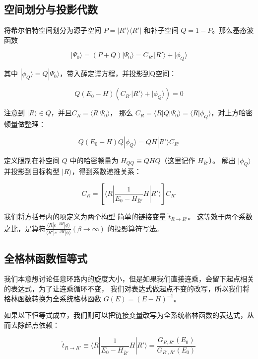\documentclass[a4paper,12pt]{article}
\begin{document}
\subsection{空间划分与投影代数}

将希尔伯特空间划分为源子空间 $P = |R'\rangle\langle R'|$ 和补子空间 $Q = 1 - P$。那么基态波函数 

$$
|\Psi_0\rangle = (P + Q) |\Psi_0\rangle= C_{R'} |R'\rangle + |\phi_Q\rangle
$$

其中 $|\phi_Q\rangle = Q|\Psi_0\rangle$，带入薛定谔方程，并投影到Q空间：

$$
Q(E_0-H) (C_{R'} |R'\rangle + |\phi_Q\rangle) = 0
$$

注意到 $|R\rangle \in Q$，并且$C_R = \langle R |\Psi_0\rangle$，
那么 $C_R = \langle R| Q |\Psi_0\rangle = \langle R |\phi_Q\rangle$，对上方哈密顿量做整理：

\begin{equation}
    Q(E_0 - H)Q |\phi_Q\rangle = Q H  |R'\rangle C_{R'}
\end{equation}

定义限制在补空间 $Q$ 中的哈密顿量为 $H_{QQ} \equiv QHQ$（这里记作 $H_{\bar{R}'}$）。
解出 $|\phi_Q\rangle$ 并投影到目标构型 $|R\rangle$，得到系数递推关系：

\begin{equation}
    C_R = \left[ \langle R | \frac{1}{E_0 - H_{\bar{R}'}} H | R' \rangle \right] C_{R'}
    \label{eq:recursion_exact}
\end{equation}

我们将方括号内的项定义为两个构型
简单的链接变量 $\tilde{t}_{R \rightarrow R'}$。
这等效于两个系数之比，是算符$\frac{\langle R|e^{-\beta H} |\phi\rangle }{\langle R'|e^{-\beta H }|\phi\rangle }
(\beta \rightarrow \infty)$
的投影算符写法。

\subsection{全格林函数恒等式}
我们本意想讨论任意环路内的旋度大小，但是如果我们直接连乘，会留下起点相关的表达式，为了让连乘循环不变，
我们对表达式做起点不变的改写，所以我们将格林函数转换为全系统格林函数 $G(E) = (E - H)^{-1}$。

如果以下恒等式成立，我们则可以把链接变量改写为全系统格林函数的表达式，从而去除起点依赖：

\begin{equation}
    \tilde{t}_{R \rightarrow R'} \equiv \langle R | \frac{1}{E_0 - H_{\bar{R}'}} H | R' \rangle = \frac{G_{R, R'}(E_0)}{G_{R', R'}(E_0)}
    \label{eq:identity_proof}
\end{equation}
\end{document}
